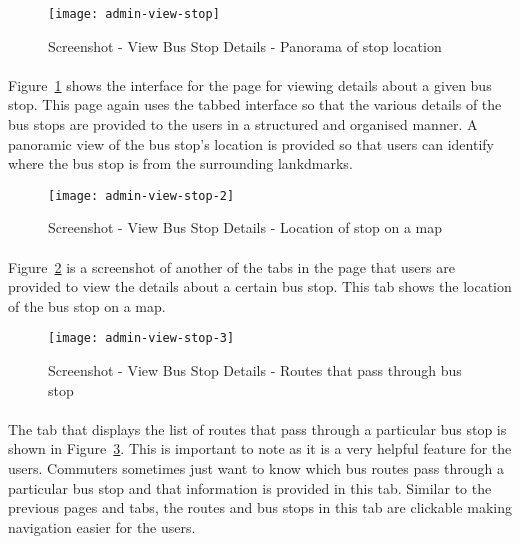 \begin {figure} [H]
\centering
\texttt{[image: admin-view-stop]}
\caption [Screenshot - View Bus Stop Details - Panorama of stop location] {Screenshot - View Bus Stop Details - Panorama of stop location}
\label {image-admin-view-stop}
\end {figure}

\paragraph{} Figure~\ref{image-admin-view-stop} shows the interface for the page for viewing details about a given bus stop. This page again uses the tabbed interface so that the various details of the bus stops are provided to the users in a structured and organised manner. A panoramic view of the bus stop's location is provided so that users can identify where the bus stop is from the surrounding lankdmarks.

\begin {figure} [H]
\centering
\texttt{[image: admin-view-stop-2]}
\caption [Screenshot - View Bus Stop Details - Location of stop on a map] {Screenshot - View Bus Stop Details - Location of stop on a map}
\label {image-admin-view-stop-2}
\end {figure}

\paragraph{} Figure~\ref{image-admin-view-stop-2} is a screenshot of another of the tabs in the page that users are provided to view the details about a certain bus stop. This tab shows the location of the bus stop on a map. 

\begin {figure} [H]
\centering
\texttt{[image: admin-view-stop-3]}
\caption [Screenshot - View Bus Stop Details - Routes that pass through bus stop] {Screenshot - View Bus Stop Details - Routes that pass through bus stop}
\label {image-admin-view-stop-3}
\end {figure}

\paragraph{} The tab that displays the list of routes that pass through a particular bus stop is shown in Figure~\ref{image-admin-view-stop-3}. This is important to note as it is a very helpful feature for the users. Commuters sometimes just want to know which bus routes pass through a particular bus stop and that information is provided in this tab. Similar to the previous pages and tabs, the routes and bus stops in this tab are clickable making navigation easier for the users.

